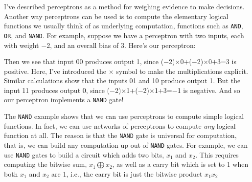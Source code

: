 I've described perceptrons as a method for weighing evidence to make decisions. Another way perceptrons can be used is to compute the elementary logical functions we usually think of as underlying computation, functions such as \lstinline{AND}, \lstinline{OR}, and \lstinline{NAND}. For example, suppose we have a perceptron with two inputs, each with weight $-$2, and an overall bias of 3. Here's our perceptron: 


\begin{marginfigure}
\end{marginfigure}


Then we see that input 00 produces output 1, since ($-$2)$\times$0+($-$2)$\times$0$+$3=3 is positive. Here, I've introduced the $\times$ symbol to make the multiplications explicit. Similar calculations show that the inputs 01 and 10 produce output 1. But the input 11 produces output 0, since ($-$2)$\times$1+($-$2)$\times$1+3=$-$1 is negative. And so our perceptron implements a \lstinline{NAND} gate!

The \lstinline{NAND} example shows that we can use perceptrons to compute simple logical functions. In fact, we can use networks of perceptrons to compute \textit{any} logical function at all. The reason is that the \lstinline{NAND} gate is universal for computation, that is, we can build any computation up out of \lstinline{NAND} gates. For example, we can use \lstinline{NAND} gates to build a circuit which adds two bits, $x_1$ and $x_2$. This requires computing the bitwise sum, $x_1\bigoplus x_2$, as well as a carry bit which is set to 1 when both $x_1$ and $x_2$ are 1, i.e., the carry bit is just the bitwise product $x_1 x_2$

